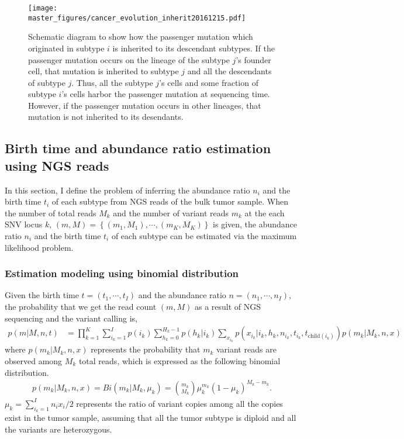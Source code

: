 \documentclass{article}
\begin{document}
\begin{figure}[H]
\begin{center}
   \texttt{[image: master\_figures/cancer\_evolution\_inherit20161215.pdf]}
 \caption{Schematic diagram to show how the passenger mutation which originated in subtype $i$ is inherited to its descendant subtypes.
 If the passenger mutation occurs on the lineage of the subtype $j$'s founder cell, that mutation is inherited to subtype $j$ and all the descendants of subtype $j$.
 Thus, all the subtype $j$'s cells and some fraction of subtype $i$'s cells harbor the passenger mutation at sequencing time.
 However, if the passenger mutation occurs in other lineages, that mutation is not inherited to its desendants.
 }
 \label{fig: mutation inheritance}
\end{center}     
\end{figure}
 
\subsection{Birth time and abundance ratio estimation using NGS reads}
In this section, I define the problem of inferring the abundance ratio $n_i$ and the birth time $t_i$ of each subtype from NGS reads of the bulk tumor sample.
When the number of total reads $M_k$ and the number of variant reads $m_k$ at the each SNV locus $k$, $(m, M) = \left\{(m_1, M_1), \cdots, (m_K, M_K) \right\}$ is given,
the abundance ratio $n_i$ and the birth time $t_i$ of each subtype can be estimated via the maximum likelihood problem.

\subsubsection{Estimation modeling using binomial distribution}
Given the birth time $t = (t_1, \cdots, t_I)$ and the abundance ratio $n = (n_1, \cdots, n_I)$, the probability that we get the read count $(m,M)$ as a result of NGS sequencing and the variant calling is,
\begin{align}
 p(m|M, n, t) & = \prod_{k=1}^{K} \sum_{i_k=1}^{I} p(i_k) \sum_{h_k=0}^{H_k-1} p(h_k | i_k) \sum_{x_{i_k}} p(x_{i_k} | i_k, h_k, n_{i_k}, t_{i_k}, t_{\mathrm{child}(i_k)}) p (m_k | M_k, n, x) \label{binom_estimation_model}
\end{align}
where $p (m_k | M_k, n, x)$ represents the probability that $m_k$ variant reads are observed among $M_k$ total reads, which is expressed as the following binomial distribution.
\begin{align}
 p (m_k | M_k, n, x) = Bi(m_k | M_k, \mu_k) = { m_k \choose M_k } \mu_k^{m_k} \left( 1 - \mu_k \right)^{M_k - m_k}.\label{param_estimation_binomial}
\end{align}
$\mu_k = \sum_{i_k = 1}^{I} n_i x_i / 2$ represents the ratio of variant copies among all the copies exist in the tumor sample, assuming that all the tumor subtype is diploid and all the variants are heterozygous.
\end{document}
